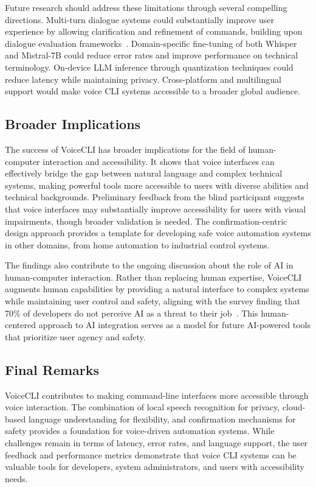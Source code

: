 \documentclass[a4paper,12pt]{article}
\begin{document}
Future research should address these limitations through several compelling directions. Multi-turn dialogue systems could substantially improve user experience by allowing clarification and refinement of commands, building upon dialogue evaluation frameworks~\cite{ref19}. Domain-specific fine-tuning of both Whisper and Mistral-7B could reduce error rates and improve performance on technical terminology. On-device LLM inference through quantization techniques could reduce latency while maintaining privacy. Cross-platform and multilingual support would make voice CLI systems accessible to a broader global audience.

\subsection{Broader Implications}

The success of VoiceCLI has broader implications for the field of human-computer interaction and accessibility. It shows that voice interfaces can effectively bridge the gap between natural language and complex technical systems, making powerful tools more accessible to users with diverse abilities and technical backgrounds. Preliminary feedback from the blind participant suggests that voice interfaces may substantially improve accessibility for users with visual impairments, though broader validation is needed. The confirmation-centric design approach provides a template for developing safe voice automation systems in other domains, from home automation to industrial control systems.

The findings also contribute to the ongoing discussion about the role of AI in human-computer interaction. Rather than replacing human expertise, VoiceCLI augments human capabilities by providing a natural interface to complex systems while maintaining user control and safety, aligning with the survey finding that 70\% of developers do not perceive AI as a threat to their job~\cite{ref2}. This human-centered approach to AI integration serves as a model for future AI-powered tools that prioritize user agency and safety.

\subsection{Final Remarks}

VoiceCLI contributes to making command-line interfaces more accessible through voice interaction. The combination of local speech recognition for privacy, cloud-based language understanding for flexibility, and confirmation mechanisms for safety provides a foundation for voice-driven automation systems. While challenges remain in terms of latency, error rates, and language support, the user feedback and performance metrics demonstrate that voice CLI systems can be valuable tools for developers, system administrators, and users with accessibility needs.
\end{document}
